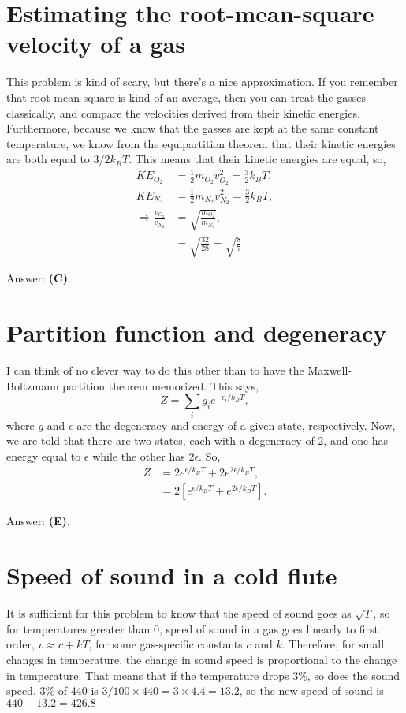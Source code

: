 \documentclass[11pt]{paper}
\newcommand{\answer}[1]{Answer: \textbf{(#1)}.}
\begin{document}
\section{Estimating the root-mean-square velocity of a gas}
This problem is kind of scary, but there's a nice approximation.  If you remember that root-mean-square is kind of an average, then you can treat the gasses classically, and compare the velocities derived from their kinetic energies.  Furthermore, because we know that the gasses are kept at the same constant temperature, we know from the equipartition theorem that their kinetic energies are both equal to $3/2k_BT$.  This means that their kinetic energies are equal, so, 
\begin{align}
KE_{O_2} &= \frac{1}{2}m_{O_2}v_{O_2}^2 = \frac{3}{2}k_B T,\\
KE_{N_2} &= \frac{1}{2}m_{N_2}v_{N_2}^2 = \frac{3}{2}k_B T,\\
\Rightarrow \frac{v_{O_2}}{v_{N_2}} &= \sqrt{\frac{m_{O_2}}{{m_{N_2}}}},\\
&= \sqrt{\frac{32}{28}} = \sqrt{\frac{8}{7}}
\end{align}

\answer{C}
\section{Partition function and degeneracy}
I can think of no clever way to do this other than to have the Maxwell-Boltzmann partition theorem memorized.  This says,
\begin{equation}
Z = \sum_i g_i e^{-\epsilon_i/k_BT},
\end{equation}
where $g$ and $\epsilon$ are the degeneracy and energy of a given state, respectively.  Now, we are told that there are two states, each with a degeneracy of 2, and one has energy equal to $\epsilon$ while the other has $2\epsilon$.  So,
\begin{align}
Z &= 2e^{\epsilon/k_BT}+2e^{2\epsilon/k_BT},\\
&= 2\left[e^{\epsilon/k_BT}+e^{2\epsilon/k_BT}\right].
\end{align}

\answer{E}

\section{Speed of sound in a cold flute}
It is sufficient for this problem to know that the speed of sound goes as $\sqrt{T}$, so for temperatures greater than 0, speed of sound in a gas goes linearly to first order, $v \approx c + kT$, for some gas-specific constants $c$ and $k$.  Therefore, for small changes in temperature, the change in sound speed is proportional to the change in temperature.  That means that if the temperature drops 3\%, so does the sound speed.  3\% of 440 is $3/100\times440 = 3\times4.4 = 13.2$, so the new speed of sound is $440-13.2 = 426.8$\\
\end{document}
